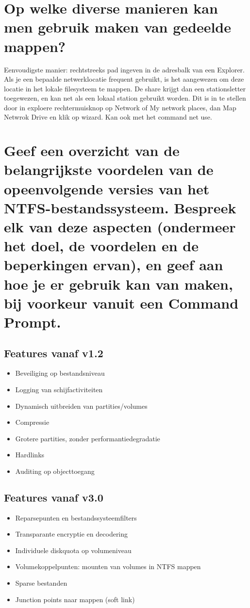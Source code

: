 \section{Op welke diverse manieren kan men gebruik maken van gedeelde mappen?}

Eenvoudigste manier: rechtstreeks pad ingeven in de adresbalk van een Explorer.
Als je een bepaalde netwerklocatie frequent gebruikt, is het aangewezen om deze
locatie in het lokale filesysteem te mappen. De share krijgt dan een
stationsletter toegewezen, en kan net als een lokaal station gebruikt worden.
Dit is in te stellen door in exploere rechtermuisknop op Network of My network
places, dan Map Netwrok Drive en klik op wizard. Kan ook met het command net
use.

\section{Geef een overzicht van de belangrijkste voordelen van de opeenvolgende
versies van het NTFS-bestandssysteem. Bespreek elk van deze aspecten (ondermeer
het doel, de voordelen en de beperkingen ervan), en geef aan hoe je er gebruik
kan van maken, bij voorkeur vanuit een Command Prompt.}

\subsection{Features vanaf v1.2}

\begin{itemize}
	\item Beveiliging op bestandsniveau
	\item Logging van schijfactiviteiten
	\item Dynamisch uitbreiden van partities/volumes
	\item Compressie
	\item Grotere partities, zonder performantiedegradatie
	\item Hardlinks
	\item Auditing op objecttoegang
\end{itemize}

\subsection{Features vanaf v3.0}

\begin{itemize}
	\item Reparsepunten en bestandssysteemfilters
	\item Transparante encryptie en decodering
	\item Individuele diskquota op volumeniveau
	\item Volumekoppelpunten: mounten van volumes in NTFS mappen
	\item Sparse bestanden
	\item Junction points naar mappen (soft link)
\end{itemize}
